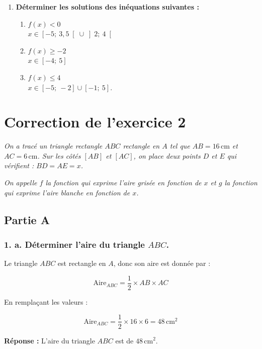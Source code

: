 \documentclass[a4paper,11pt]{article}
\begin{document}
\begin{enumerate}
    \item \textbf{Déterminer les solutions des inéquations suivantes :}
    \begin{enumerate}
        \item \( f(x) < 0 \) \\ $x \in \left[-5;\ 3,5\right[ \cup \left] 2;\ 4 \right[$
        \item \( f(x) \geq -2 \) \\ $x \in \left[-4;\ 5\right]$
        \item \( f(x) \leq 4 \) \\
        $x \in \left[-5;\ -2\right] \cup \left[ -1;\ 5 \right]$.
    \end{enumerate}
\end{enumerate}


\section*{Correction de l'exercice 2}

\textit{On a tracé un triangle rectangle $ABC$ rectangle en $A$ tel que $AB = 16\,\text{cm}$ et $AC = 6\,\text{cm}$. Sur les côtés $[AB]$ et $[AC]$, on place deux points $D$ et $E$ qui vérifient : $BD = AE = x$.}

\textit{On appelle $f$ la fonction qui exprime l’aire grisée en fonction de $x$ et $g$ la fonction qui exprime l’aire blanche en fonction de $x$.}

\subsection*{Partie A}

\subsubsection*{1. a. Déterminer l’aire du triangle $ABC$.}

Le triangle $ABC$ est rectangle en $A$, donc son aire est donnée par :

\[
\text{Aire}_{ABC} = \dfrac{1}{2} \times AB \times AC
\]

En remplaçant les valeurs :

\[
\text{Aire}_{ABC} = \dfrac{1}{2} \times 16 \times 6 = 48\,\text{cm}^2
\]

\textbf{Réponse :} L'aire du triangle $ABC$ est de $48\,\text{cm}^2$.
\end{document}
